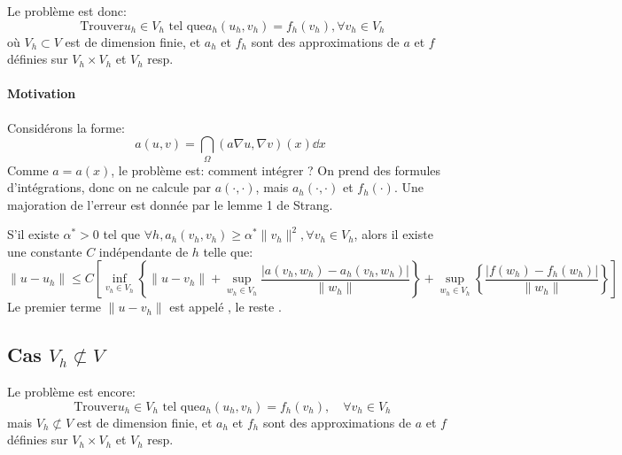 Le problème est donc:
\begin{equation}
\text{ Trouver} u_h\in V_h \text{ tel que} a_h(u_h,v_h) = f_h(v_h), \forall v_h\in V_h
\end{equation}
où $V_h\subset V$ est de dimension finie, et $a_h$ et $f_h$ sont des approximations
de $a$ et $f$ définies sur $V_h\times V_h$ et $V_h$ resp.
\medskip
{}
\medskip
\paragraph{Motivation}
Considérons la forme:
\begin{equation}a(u,v)=\dint_\Omega (a\nabla u,\nabla v)(x)\dd x\end{equation}
Comme $a=a(x)$, le problème est: comment intégrer ?
On prend des formules d'intégrations, donc on ne calcule par $a(\cdot,\cdot)$,
mais $a_h(\cdot,\cdot)$ et $f_h(\cdot)$.
\medskip
Une majoration de l'erreur est donnée par le lemme 1 de Strang.

\begin{lemme}
S'il existe $\alpha^*>0$ tel que $\forall h, a_h(v_h,v_h)\ge\alpha^*\|v_h\|^2, \forall v_h\in V_h$,
alors il existe une constante $C$ indépendante de $h$ telle que:
\begin{equation}
\|u-u_h\|\le C\left[
\inf_{v_h\in V_h} \left\{ \|u-v_h\| + \sup_{w_h\in V_h} \dfrac{|a(v_h,w_h)-a_h(v_h,w_h)|}{\|w_h\|}\right\}
+\sup_{w_h\in V_h}\left\{\dfrac{|f(w_h)-f_h(w_h)|}{\|w_h\|}\right\}
\right]
\end{equation}
Le premier terme $ \|u-v_h\|$ est appelé ,
le reste .
\end{lemme}

\medskip
\subsection{Cas $V_h\not\subset V$}
Le problème est encore:
\begin{equation}
\text{ Trouver} u_h\in V_h \text{ tel que} a_h(u_h,v_h) = f_h(v_h),\quad \forall v_h\in V_h
\end{equation}
mais $V_h\not\subset V$ est de dimension finie, et $a_h$ et $f_h$ sont des approximations
de $a$ et $f$ définies sur $V_h\times V_h$ et $V_h$ resp.

